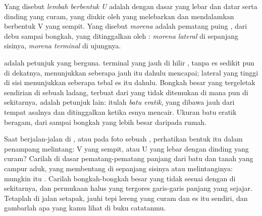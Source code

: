 \begin{definition}\label{def:g8:ice-on-earth:glacial-landforms}
Yang disebut \emph{lembah berbentuk U} adalah
 dengan dasar yang lebar dan datar serta dinding yang curam, yang
diukir oleh  yang melebarkan dan mendalamkan  
berbentuk V yang sempit. Yang disebut \emph{morena} adalah
pematang puing , dari debu sampai bongkah, yang ditinggalkan oleh
: \emph{morena lateral} di sepanjang sisinya, \emph{morena
terminal} di ujungnya.
\end{definition}

 adalah petunjuk yang berguna.  terminal yang jauh di hilir
, tanpa es sedikit pun di dekatnya, menunjukkan seberapa jauh
 itu dahulu mencapai;  lateral yang tinggi di sisi 
menunjukkan seberapa tebal es itu dahulu. Bongkah besar yang tergeletak
sendirian di sebuah ladang, terbuat dari  yang tidak ditemukan di
mana pun di sekitarnya, adalah petunjuk lain: itulah \emph{batu eratik},
 yang dibawa  jauh dari tempat asalnya dan ditinggalkan
ketika esnya mencair. Ukuran batu eratik beragam, dari  sampai
bongkah yang lebih besar daripada rumah.

\begin{inthefield}
Saat berjalan-jalan di , atau pada foto sebuah  ,
perhatikan bentuk  itu dalam penampang melintang: V yang sempit,
atau U yang lebar dengan dinding yang curam? Carilah di dasar 
pematang-pematang panjang dari batu dan tanah yang campur aduk, yang
membentang di sepanjang sisinya atau melintanginya: mungkin itu .
Carilah bongkah-bongkah besar yang tidak sesuai dengan  di
sekitarnya, dan permukaan  halus yang tergores garis-garis panjang
yang sejajar. Tetaplah di jalan setapak, jauhi tepi lereng yang curam dan
es itu sendiri, dan gambarlah apa yang kamu lihat di buku catatanmu.
\end{inthefield}

